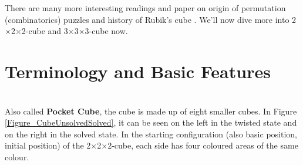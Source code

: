 \documentclass[12pt,a4paper]{article}
\theoremstyle{custom}
\newcommand{\Ttwo}{2$\times$2$\times$2-}
\newcommand{\Tthree}{3$\times$3$\times$3-}
\begin{document}
There are many more interesting readings and paper on origin of permutation (combinatorics) puzzles \cite{BIGGS1979109} and history of Rubik's cube \cite{pekonen2021cubed}. We'll now dive more into \Ttwo cube and \Tthree cube now. 


\section{Terminology and Basic Features}
\fbox{\textbf{\Ttwo Cubes}} \\

Also called \textbf{Pocket Cube}, the cube is made up of eight smaller cubes.
In Figure \ref{Figure_CubeUnsolvedSolved}, it can be seen on the left in the twisted state and on the right in the solved state. 
In the starting configuration (also basic position, initial position) of the \Ttwo cube, each side has four coloured areas of the same colour.
\end{document}
